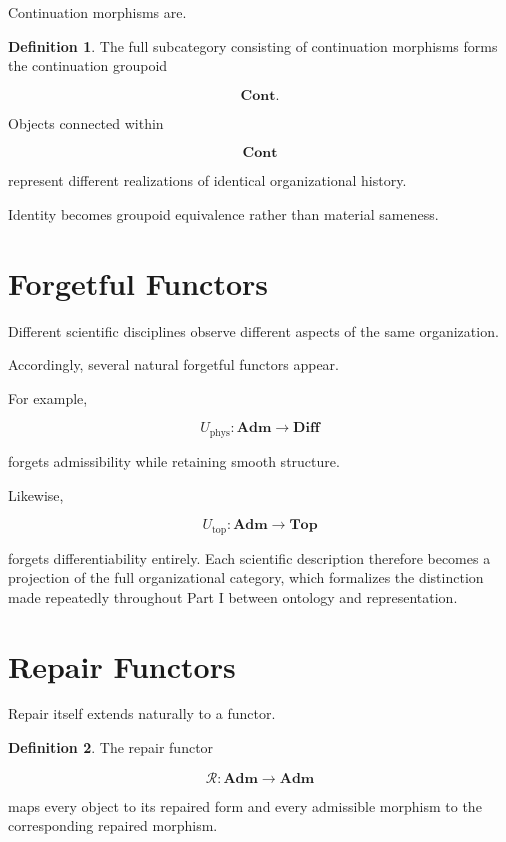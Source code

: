 \documentclass[11pt,oneside]{book}
\numberwithin{equation}{chapter}
\theoremstyle{definition}
\newtheorem{definition}{Definition}[chapter]
\theoremstyle{plain}
\begin{document}
Continuation morphisms are.

\begin{definition}

The full subcategory consisting of continuation morphisms forms the
continuation groupoid

\[
\mathbf{Cont}.
\]

\end{definition}

Objects connected within

\[
\mathbf{Cont}
\]

represent different realizations of identical organizational history.

Identity becomes groupoid equivalence rather than material sameness.

\section{Forgetful Functors}

Different scientific disciplines observe different aspects of the same
organization.

Accordingly, several natural forgetful functors appear.

For example,

\[
U_{\mathrm{phys}}
:
\mathbf{Adm}
\rightarrow
\mathbf{Diff}
\]

forgets admissibility while retaining smooth structure.

Likewise,

\[
U_{\mathrm{top}}
:
\mathbf{Adm}
\rightarrow
\mathbf{Top}
\]

forgets differentiability entirely. Each scientific description therefore becomes a projection of the full organizational category, which formalizes the distinction made repeatedly throughout Part I between ontology and representation.

\section{Repair Functors}

Repair itself extends naturally to a functor.

\begin{definition}

The repair functor

\[
\mathcal R:
\mathbf{Adm}
\rightarrow
\mathbf{Adm}
\]

maps every object to its repaired form and every admissible morphism to the
corresponding repaired morphism.

\end{definition}
\end{document}
